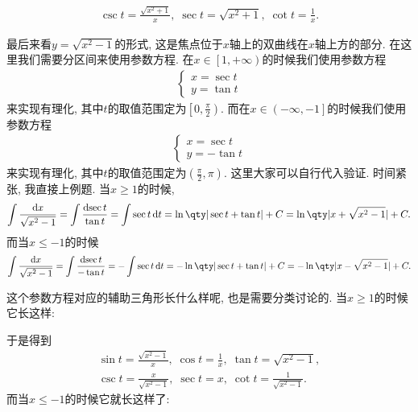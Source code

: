 \documentclass{ctexbook}
\newcommand*{\dif}{\mathop{}\!\mathrm{d}}
\begin{document}
{\begin{align*}
\csc{t}=\frac{\sqrt{x^{2}+1}}{x},\;\sec{t}=\sqrt{x^{2}+1},\;\cot{t}=\frac{1}{x}
.\end{align*}\par
最后来看$y=\sqrt{x^{2}-1}$的形式, 这是焦点位于$x$轴上的双曲线在$x$轴上方的部分. 在这里我们需要分区间来使用参数方程. 在$x\in\left[1,+\infty\right)$的时候我们使用参数方程
\begin{align*}
\begin{cases}
x=\sec{t}\\
y=\tan{t}
\end{cases}
\end{align*}
来实现有理化, 其中$t$的取值范围定为$\left[0,\frac{\pi}{2}\right)$. 而在$x\in\left(-\infty,-1\right]$的时候我们使用参数方程
\begin{align*}
\begin{cases}
x=\sec{t}\\
y=-\tan{t}
\end{cases}
\end{align*}
来实现有理化, 其中$t$的取值范围定为$\left(\frac{\pi}{2},\pi\right)$. 这里大家可以自行代入验证. 时间紧张, 我直接上例题.  当$x\ge1$的时候, 
\begin{align*}
\int\frac{\dif{x}}{\sqrt{x^{2}-1}}=\int\frac{\dif{\sec{t}}}{\tan{t}}=\int\sec{t}\dif{t}=\ln\qty|\sec{t}+\tan{t}|+C=\ln\qty|x+\sqrt{x^{2}-1}|+C
.\end{align*}
而当$x\le-1$的时候
\begin{align*}
\int\frac{\dif{x}}{\sqrt{x^{2}-1}}=\int\frac{\dif{\sec{t}}}{-\tan{t}}=-\int\sec{t}\dif{t}=-\ln\qty|\sec{t}+\tan{t}|+C=-\ln\qty|x-\sqrt{x^{2}-1}|+C
.\end{align*}\par
这个参数方程对应的辅助三角形长什么样呢, 也是需要分类讨论的. 当$x\ge1$的时候它长这样: 
\begin{center}
\end{center}
于是得到
\begin{align*}
\sin{t}=\frac{\sqrt{x^{2}-1}}{x},\;\cos{t}=\frac{1}{x},\;\tan{t}=\sqrt{x^{2}-1},\\
\csc{t}=\frac{x}{\sqrt{x^{2}-1}},\;\sec{t}=x,\;\cot{t}=\frac{1}{\sqrt{x^{2}-1}}
.\end{align*}
而当$x\le-1$的时候它就长这样了: 
\begin{center}

\end{center}}
\end{document}
